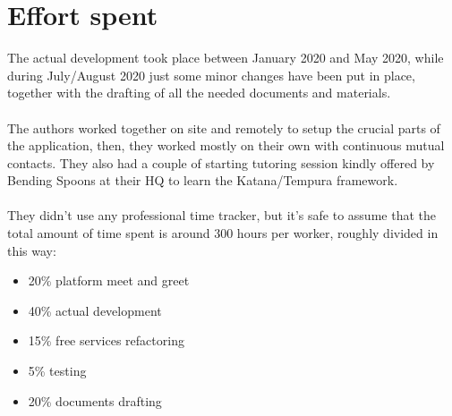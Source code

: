 \documentclass[a4paper, 11pt, parskip=half]{scrreprt}
\theoremstyle{definition}
\begin{document}
\chapter{Effort spent}

The actual development took place between January 2020 and May 2020, while during July/August 2020 just some minor changes have been put in place, together with the drafting of all the needed documents and materials.
\\\\The authors worked together on site and remotely to setup the crucial parts of the application, then, they worked mostly on their own with continuous mutual contacts. They also had a couple of starting tutoring session kindly offered by Bending Spoons at their HQ to learn the Katana/Tempura framework.
\\\\They didn't use any professional time tracker, but it's safe to assume that the total amount of time spent is around 300 hours per worker, roughly divided in this way:

\begin{itemize}
	\item 20\% platform meet and greet
	\item 40\% actual development
	\item 15\% free services refactoring
	\item 5\% testing
	\item 20\% documents drafting
\end{itemize}
\end{document}
